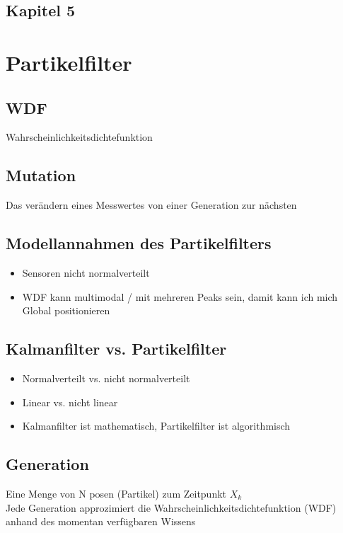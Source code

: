 \section{Kapitel 5}
\label{sec:faq:kap5}

\newpage

\chapter{Partikelfilter}
\label{kap6Partikelfilter}


	
	\section{WDF}
	Wahrscheinlichkeitsdichtefunktion \cite{wdf}
	
	\section{Mutation}
	Das verändern eines Messwertes von einer Generation zur nächsten
	
	\section{Modellannahmen des Partikelfilters}
	
	\begin{itemize}
		\item Sensoren nicht normalverteilt
		\item WDF kann multimodal / mit mehreren Peaks sein, damit kann ich mich Global positionieren
	\end{itemize}
	

		
	
	\section{Kalmanfilter vs. Partikelfilter}	
		\begin{itemize}
		\item Normalverteilt vs. nicht normalverteilt
		\item Linear vs. nicht linear
		\item Kalmanfilter ist mathematisch, Partikelfilter ist algorithmisch
	\end{itemize}

	\section{Generation}
		Eine Menge von N posen (Partikel) zum Zeitpunkt $X_k$ \\
		Jede Generation approzimiert die Wahrscheinlichkeitsdichtefunktion (WDF) anhand des momentan verfügbaren Wissens

